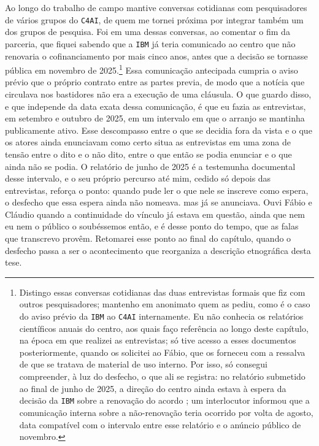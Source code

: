 Ao longo do trabalho de campo mantive conversas cotidianas com pesquisadores de vários grupos do \texttt{C4AI}, de quem me tornei próxima por integrar também um dos grupos de pesquisa. Foi em uma dessas conversas, ao comentar o fim da parceria, que fiquei sabendo que a \texttt{IBM} já teria comunicado ao centro que não renovaria o cofinanciamento por mais cinco anos, antes que a decisão se tornasse pública em novembro de 2025.\footnote{Distingo essas conversas cotidianas das duas entrevistas formais que fiz com outros pesquisadores; mantenho em anonimato quem as pediu, como é o caso do aviso prévio da \texttt{IBM} ao \texttt{C4AI} internamente. Eu não conhecia os relatórios científicos anuais do centro, aos quais faço referência ao longo deste capítulo, na época em que realizei as entrevistas; só tive acesso a esses documentos posteriormente, quando os solicitei ao Fábio, que os forneceu com a ressalva de que se tratava de material de uso interno. Por isso, só consegui compreender, à luz do desfecho, o que ali se registra: no relatório submetido ao final de junho de 2025, a direção do centro ainda estava à espera da decisão da \texttt{IBM} sobre a renovação do acordo \parencite[p.~5]{C4AI2025}; um interlocutor informou que a comunicação interna sobre a não-renovação teria ocorrido por volta de agosto, data compatível com o intervalo entre esse relatório e o anúncio público de novembro.} Essa comunicação antecipada cumpria o aviso prévio que o próprio contrato entre as partes previa, de modo que a notícia que circulava nos bastidores não era a execução de uma cláusula. O que guardo disso, e que independe da data exata dessa comunicação, é que eu fazia as entrevistas, em setembro e outubro de 2025, em um intervalo em que o arranjo se mantinha publicamente ativo. Esse descompasso entre o que se decidia fora da vista e o que os atores ainda enunciavam como certo situa as entrevistas em uma zona de tensão entre o dito e o não dito, entre o que então se podia enunciar e o que ainda não se podia. O relatório de junho de 2025 é a testemunha documental desse intervalo, e o seu próprio percurso até mim, cedido só depois das entrevistas, reforça o ponto: quando pude ler o que nele se inscreve como espera, o desfecho que essa espera ainda não nomeava. mas já se anunciava. Ouvi Fábio e Cláudio quando a continuidade do vínculo já estava em questão, ainda que nem eu nem o público o soubéssemos então, e é desse ponto do tempo, que as falas que transcrevo provêm. Retomarei esse ponto ao final do capítulo, quando o desfecho passa a ser o acontecimento que reorganiza a descrição etnográfica desta tese.

